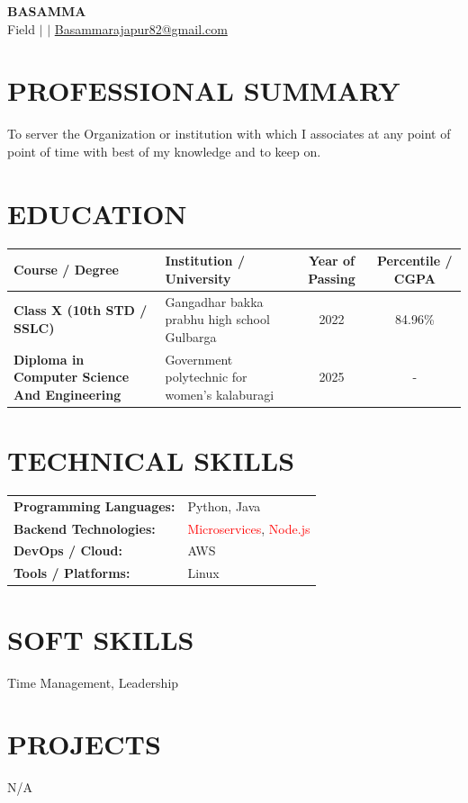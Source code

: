 \documentclass[9.5pt,a4paper]{extarticle}
\begin{document}
\begin{center}
{\Large \textbf{BASAMMA}} \\ \vspace{2pt}
Field \quad $|$  \quad $|$ \quad \href{mailto:Basammarajapur82@gmail.com}{Basammarajapur82@gmail.com}
\end{center}

\section*{PROFESSIONAL SUMMARY}
To server the Organization or institution with which I associates at any point of point of time with best of my knowledge and to keep on.

\section*{EDUCATION}
{\small
\renewcommand{\arraystretch}{1.18}
\noindent\begin{tabularx}{\textwidth}{|p{1.7in}|X|c|c|}
\hline
\textbf{Course / Degree} & \textbf{Institution / University} & \textbf{Year of Passing} & \textbf{Percentile / CGPA} \\ \hline
\textbf{Class X (10th STD / SSLC)} & Gangadhar bakka prabhu high school Gulbarga & 2022 & 84.96\% \\ \hline
\textbf{Diploma in Computer Science And Engineering} & Government polytechnic for women's kalaburagi & 2025 & - \\ \hline
\end{tabularx}
}\vspace{4pt}


\section*{TECHNICAL SKILLS}
\begin{tabular}{@{}p{2.3in}p{4.6in}@{}}
\textbf{Programming Languages:} & Python, Java \\
\textbf{Backend Technologies:} & \textcolor{red}{Microservices}, \textcolor{red}{Node.js} \\
\textbf{DevOps / Cloud:} & AWS \\
\textbf{Tools / Platforms:} & Linux \\
\end{tabular}

\section*{SOFT SKILLS}
\noindent Time Management, Leadership \vspace{4pt}



\section*{PROJECTS}
N/A


\end{document}
